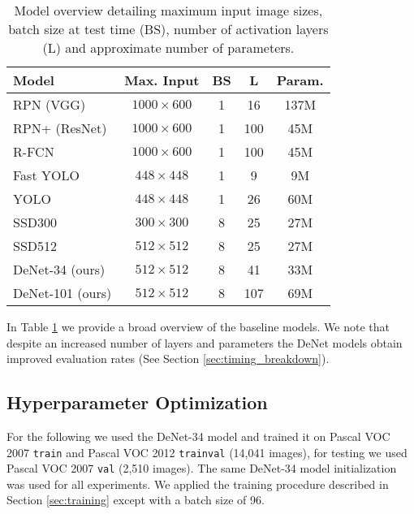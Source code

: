 \documentclass[10pt,twocolumn]{article}
\begin{document}
\begin{table}[htb]
\begin{center}
\begin{tabular}{ l |c| c| c|c }
Model & Max. Input & BS & L & Param. \\
\hline
\rowcolor[gray]{.85} RPN (VGG)\cite{faster-rcnn} & $1000\times 600$ & 1 & 16 & 137M \\
\rowcolor[gray]{.85} RPN+ (ResNet)\cite{resnet} & $1000\times 600$ & 1 & 100 & 45M \\
\rowcolor[gray]{.85} R-FCN \cite{r-fcn} & $1000\times 600$ & 1 & 100 & 45M \\
Fast YOLO\cite{yolo} & $448\times 448$ & 1 & 9 & 9M  \\
YOLO\cite{yolo} & $448\times 448$ & 1 & 26 & 60M \\
SSD300\cite{ssd} & $300\times 300$ & 8 & 25 & 27M  \\
SSD512\cite{ssd} & $512\times 512$ & 8 & 25 & 27M \\
\hline
DeNet-34 (ours) & $512\times 512$ & 8 & 41 & 33M \\
DeNet-101 (ours) & $512\times 512$ & 8 & 107  & 69M \\
\end{tabular}
\end{center}
\caption{Model overview detailing maximum input image sizes, batch size at test time (BS), number of activation layers (L) and approximate number of parameters. }
\label{table:model_overview}
\end{table}

In Table \ref{table:model_overview} we provide a broad overview of the baseline models. We note that despite an increased number of layers and parameters the DeNet models obtain improved evaluation rates (See Section \ref{sec:timing_breakdown}). 

\subsection{Hyperparameter Optimization}

For the following we used the DeNet-34 model and trained it on Pascal VOC 2007 \texttt{train} and Pascal VOC 2012 \texttt{trainval} (14,041 images), for testing we used Pascal VOC 2007 \texttt{val} (2,510 images). The same DeNet-34 model initialization was used for all experiments. We applied the training procedure described in Section \ref{sec:training} except with a batch size of 96. 
\end{document}
